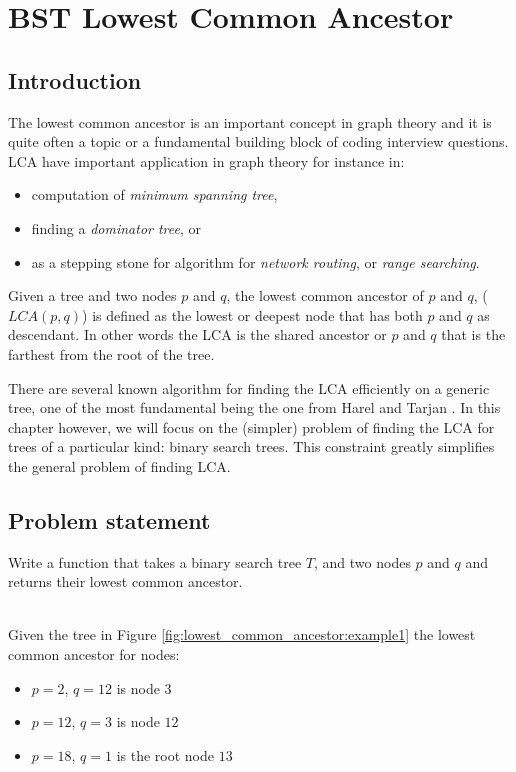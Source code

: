 %

\chapter{BST Lowest Common Ancestor}
\label{ch:lowest_common_ancestor}
\section*{Introduction}
The lowest common ancestor is an important concept in graph theory and it is quite often a topic or
a fundamental building block of coding interview questions. LCA have important application in graph
theory for instance in:
\begin{itemize}
	\item computation of \textit{minimum spanning tree},
	\item finding a \textit{dominator tree}, or
	\item as a stepping stone for algorithm for \textit{network routing}, or \textit{range
	searching}.
\end{itemize}
Given a tree and two nodes $p$ and $q$, the lowest common ancestor  of $p$ and $q$, ($LCA(p,q)$) is
defined as the lowest or deepest node that has both $p$ and $q$ as descendant. In other words the
LCA is the shared ancestor or $p$ and $q$ that is the farthest from the root of the tree. 

There are
several known algorithm for finding the LCA efficiently on a generic tree, one of the most
fundamental being the one from Harel and Tarjan \cite{harel84,harel80}.
In this chapter however, we will focus on the (simpler) problem of finding the LCA for  trees of a
particular kind: binary search trees. This constraint greatly simplifies the general problem of finding LCA. 
\section{Problem statement}
\begin{exercise}
	Write a function that takes a binary search tree $T$, and two nodes $p$ and $q$ and returns
	their lowest common ancestor.

	\begin{example}
		\hfill \\
		Given the tree in Figure \ref{fig:lowest_common_ancestor:example1} the lowest common
		ancestor for nodes:
		\begin{itemize}
			\item $p = 2$, $q=12$ is node $3$
			\item $p = 12$, $q=3$ is node $12$
			\item $p = 18$, $q=1$ is the root node $13$
		\end{itemize}
		\label{ex:lower_common_ancestor:example1}
	\end{example}
\end{exercise}

